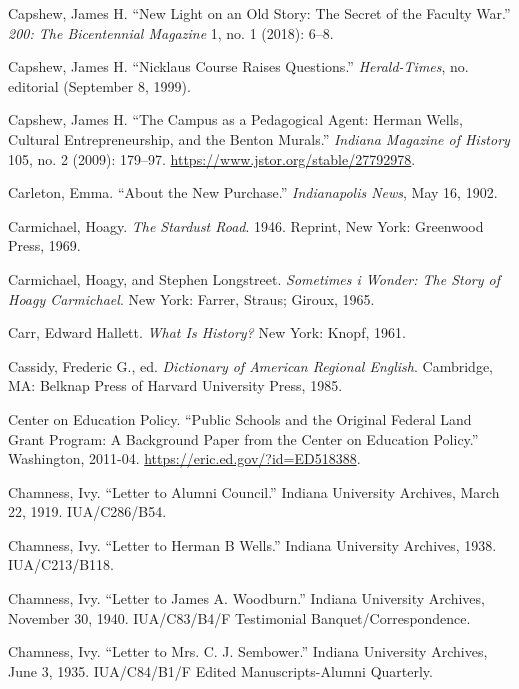 \documentclass[
  american,
  letterpaper,
]{scrreprt}
\newlength{\cslhangindent}
\newenvironment{CSLReferences}[2] %
 {\begin{list}{}{%
  \setlength{\itemindent}{0pt}
  \setlength{\leftmargin}{0pt}
  \setlength{\parsep}{0pt}
  \ifodd #1
   \setlength{\leftmargin}{\cslhangindent}
   \setlength{\itemindent}{-1\cslhangindent}
  \fi
  \setlength{\itemsep}{#2\baselineskip}}}
 {\end{list}}
\begin{document}
\begin{CSLReferences}{1}{0}
Capshew, James H. {``New Light on an Old Story: The Secret of the
Faculty War.''} \emph{200: The Bicentennial Magazine} 1, no. 1 (2018):
6--8.

Capshew, James H. {``Nicklaus Course Raises Questions.''}
\emph{Herald-Times}, no. editorial (September 8, 1999).

Capshew, James H. {``The Campus as a Pedagogical Agent: Herman Wells,
Cultural Entrepreneurship, and the Benton Murals.''} \emph{Indiana
Magazine of History} 105, no. 2 (2009): 179--97.
\url{https://www.jstor.org/stable/27792978}.

Carleton, Emma. {``About the New Purchase.''} \emph{Indianapolis News},
May 16, 1902.

Carmichael, Hoagy. \emph{The Stardust Road}. 1946. Reprint, New York:
Greenwood Press, 1969.

Carmichael, Hoagy, and Stephen Longstreet. \emph{Sometimes i Wonder: The
Story of Hoagy Carmichael}. New York: Farrer, Straus; Giroux, 1965.

Carr, Edward Hallett. \emph{What Is History?} New York: Knopf, 1961.

Cassidy, Frederic G., ed. \emph{Dictionary of American Regional
English}. Cambridge, MA: Belknap Press of Harvard University Press,
1985.

Center on Education Policy. {``Public Schools and the Original Federal
Land Grant Program: A Background Paper from the Center on Education
Policy.''} Washington, 2011-04. \url{https://eric.ed.gov/?id=ED518388}.

Chamness, Ivy. {``Letter to Alumni Council.''} Indiana University
Archives, March 22, 1919. IUA/C286/B54.

Chamness, Ivy. {``Letter to Herman {B} Wells.''} Indiana University
Archives, 1938. IUA/C213/B118.

Chamness, Ivy. {``Letter to James {A.} Woodburn.''} Indiana University
Archives, November 30, 1940. IUA/C83/B4/F Testimonial
Banquet/Correspondence.

Chamness, Ivy. {``Letter to Mrs. C. J. Sembower.''} Indiana University
Archives, June 3, 1935. IUA/C84/B1/F Edited Manuscripts-Alumni
Quarterly.


\end{CSLReferences}
\end{document}
